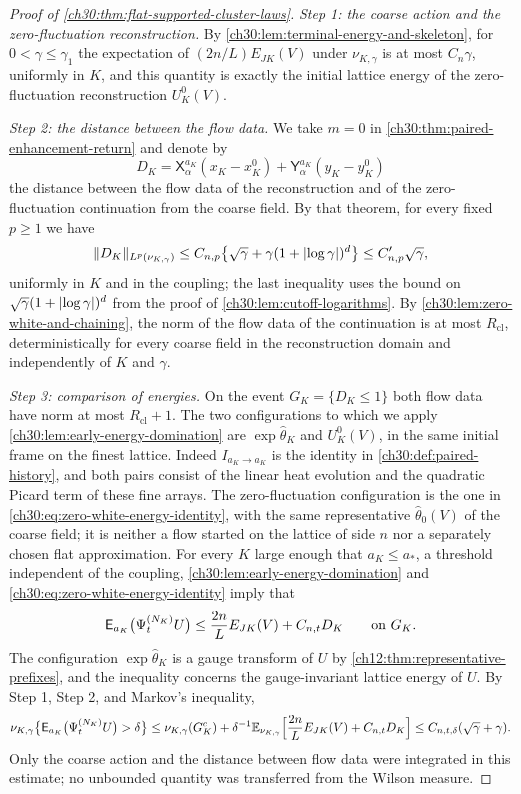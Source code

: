 \begin{proof}[Proof of \cref{ch30:thm:flat-supported-cluster-laws}]
\emph{Step 1: the coarse action and the zero-fluctuation reconstruction.} By \cref{ch30:lem:terminal-energy-and-skeleton}, for $0<\gamma\le\gamma_1$ the expectation of $(2n/L)E_{JK}(V)$ under $\nu_{K,\gamma}$ is at most $C_n\gamma$, uniformly in $K$, and this quantity is exactly the initial lattice energy of the zero-fluctuation reconstruction $U_K^0(V)$.

\emph{Step 2: the distance between the flow data.} We take $m=0$ in \cref{ch30:thm:paired-enhancement-return} and denote by
\[
 D_K=\mathsf X_\alpha^{a_K}(x_K-x_K^0)+\mathsf Y_\alpha^{a_K}(y_K-y_K^0)
\]
the distance between the flow data of the reconstruction and of the zero-fluctuation continuation from the coarse field. By that theorem, for every fixed $p\ge1$ we have
\[
 \lVert D_K\rVert_{L^p(\nu_{K,\gamma})}\le C_{n,p}\bigl\{\sqrt\gamma+\gamma(1+\lvert \log\gamma\rvert)^d\bigr\}\le C'_{n,p}\sqrt\gamma,
\]
uniformly in $K$ and in the coupling; the last inequality uses the bound on $\sqrt\gamma(1+\lvert \log\gamma\rvert)^d$ from the proof of \cref{ch30:lem:cutoff-logarithms}. By \cref{ch30:lem:zero-white-and-chaining}, the norm of the flow data of the continuation is at most $R_{\mathrm{cl}}$, deterministically for every coarse field in the reconstruction domain and independently of $K$ and $\gamma$.

\emph{Step 3: comparison of energies.} On the event $G_K=\{D_K\le1\}$ both flow data have norm at most $R_{\mathrm{cl}}+1$. The two configurations to which we apply \cref{ch30:lem:early-energy-domination} are $\exp\widehat\theta_K$ and $U_K^0(V)$, in the same initial frame on the finest lattice. Indeed $I_{a_K\to a_K}$ is the identity in \cref{ch30:def:paired-history}, and both pairs consist of the linear heat evolution and the quadratic Picard term of these fine arrays. The zero-fluctuation configuration is the one in \eqref{ch30:eq:zero-white-energy-identity}, with the same representative $\widehat\theta_0(V)$ of the coarse field; it is neither a flow started on the lattice of side $n$ nor a separately chosen flat approximation. For every $K$ large enough that $a_K\le a_*$, a threshold independent of the coupling, \cref{ch30:lem:early-energy-domination} and \eqref{ch30:eq:zero-white-energy-identity} imply that
\[
 \mathsf E_{a_K}\bigl(\Psi^{(N_K)}_tU\bigr)\le\frac{2n}{L}E_{JK}(V)+C_{n,t}D_K\qquad\text{on }G_K .
\]
The configuration $\exp\widehat\theta_K$ is a gauge transform of $U$ by \cref{ch12:thm:representative-prefixes}, and the inequality concerns the gauge-invariant lattice energy of $U$. By Step 1, Step 2, and Markov's inequality,
\[
 \nu_{K,\gamma}\bigl\{\mathsf E_{a_K}\bigl(\Psi^{(N_K)}_tU\bigr)>\delta\bigr\}\le\nu_{K,\gamma}(G_K^c)+\delta^{-1}\mathbb E_{\nu_{K,\gamma}}\Bigl[\frac{2n}{L}E_{JK}(V)+C_{n,t}D_K\Bigr]\le C_{n,t,\delta}(\sqrt\gamma+\gamma).
\]
Only the coarse action and the distance between flow data were integrated in this estimate; no unbounded quantity was transferred from the Wilson measure.


\end{proof}

